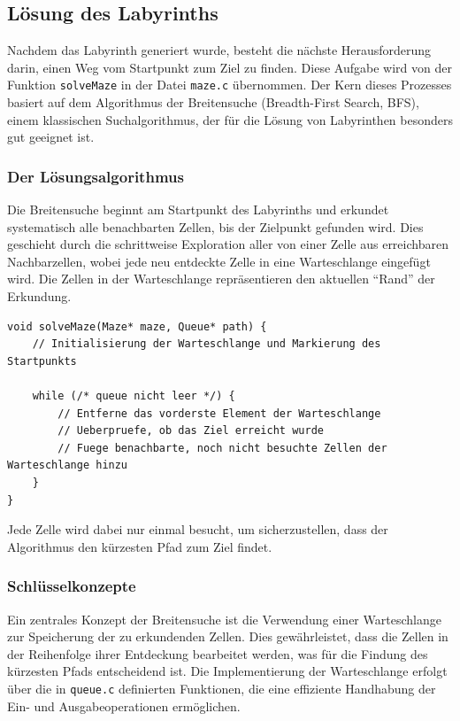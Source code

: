 \subsection{Lösung des Labyrinths}

Nachdem das Labyrinth generiert wurde, besteht die nächste Herausforderung darin, einen Weg vom Startpunkt zum Ziel zu finden. Diese Aufgabe wird von der Funktion \texttt{solveMaze} in der Datei \texttt{maze.c} übernommen. Der Kern dieses Prozesses basiert auf dem Algorithmus der Breitensuche (Breadth-First Search, BFS), einem klassischen Suchalgorithmus, der für die Lösung von Labyrinthen besonders gut geeignet ist.

\subsubsection{Der Lösungsalgorithmus}

Die Breitensuche beginnt am Startpunkt des Labyrinths und erkundet systematisch alle benachbarten Zellen, bis der Zielpunkt gefunden wird. Dies geschieht durch die schrittweise Exploration aller von einer Zelle aus erreichbaren Nachbarzellen, wobei jede neu entdeckte Zelle in eine Warteschlange eingefügt wird. Die Zellen in der Warteschlange repräsentieren den aktuellen “Rand” der Erkundung. 

\begin{lstlisting}[style=CStyle]
void solveMaze(Maze* maze, Queue* path) {
    // Initialisierung der Warteschlange und Markierung des Startpunkts
    
    while (/* queue nicht leer */) {
        // Entferne das vorderste Element der Warteschlange
        // Ueberpruefe, ob das Ziel erreicht wurde
        // Fuege benachbarte, noch nicht besuchte Zellen der Warteschlange hinzu
    }
}
\end{lstlisting}

Jede Zelle wird dabei nur einmal besucht, um sicherzustellen, dass der Algorithmus den kürzesten Pfad zum Ziel findet.

\subsubsection{Schlüsselkonzepte}

Ein zentrales Konzept der Breitensuche ist die Verwendung einer Warteschlange zur Speicherung der zu erkundenden Zellen. Dies gewährleistet, dass die Zellen in der Reihenfolge ihrer Entdeckung bearbeitet werden, was für die Findung des kürzesten Pfads entscheidend ist. Die Implementierung der Warteschlange erfolgt über die in \texttt{queue.c} definierten Funktionen, die eine effiziente Handhabung der Ein- und Ausgabeoperationen ermöglichen.

